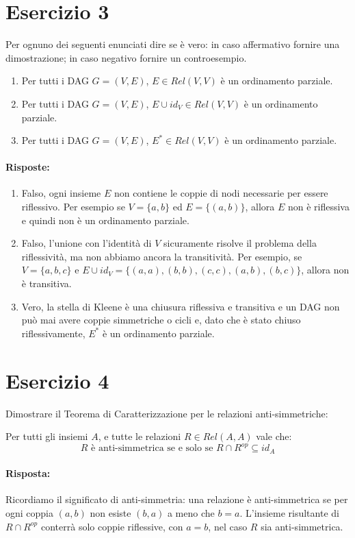 \documentclass[a4paper,12pt]{article}
\begin{document}
\section{Esercizio 3}
Per ognuno dei seguenti enunciati dire se è vero: in caso affermativo
fornire una dimostrazione; in caso negativo fornire un controesempio.

\begin{enumerate}
    \item Per tutti i DAG $G = (V,E)$, $E \in Rel(V,V)$ è un ordinamento parziale.
    \item Per tutti i DAG $G = (V,E)$, $E \cup id_V \in Rel(V,V)$ è un ordinamento parziale.
    \item Per tutti i DAG $G = (V,E)$, $E^* \in Rel(V,V)$ è un ordinamento parziale.
\end{enumerate}

\paragraph{Risposte:}
\begin{enumerate}
    \item Falso, ogni insieme $E$ non contiene le coppie di nodi necessarie per essere riflessivo.
    Per esempio se $V = \{a,b\}$ ed $E = \{(a,b)\}$, allora $E$ non è riflessiva e quindi non è un ordinamento parziale.
    \item Falso, l'unione con l'identità di $V$ sicuramente risolve il problema della riflessività, ma non abbiamo ancora la transitività.
    Per esempio, se $V = \{a,b,c\}$ e $E \cup id_V = \{(a,a),(b,b),(c,c),(a,b),(b,c)\}$, allora non è transitiva.
    \item Vero, la stella di Kleene è una chiusura riflessiva e transitiva e un DAG non può mai avere coppie simmetriche o cicli e, dato che è stato chiuso riflessivamente, $E^*$ è un ordinamento parziale.
\end{enumerate}

\section{Esercizio 4}
Dimostrare il Teorema di Caratterizzazione per le relazioni anti-simmetriche:

Per tutti gli insiemi $A$, e tutte le relazioni $R \in Rel(A,A)$ vale che:
\[
R \text{ è anti-simmetrica se e solo se } R \cap R^{op} \subseteq id_A
\]

\paragraph{Risposta:}
Ricordiamo il significato di anti-simmetria:
una relazione è anti-simmetrica se per ogni coppia $(a,b)$ non esiste $(b,a)$ a meno che $b = a$.  
L'insieme risultante di $R \cap R^{op}$ conterrà solo coppie riflessive, con $a = b$, nel caso $R$ sia anti-simmetrica.
\end{document}
